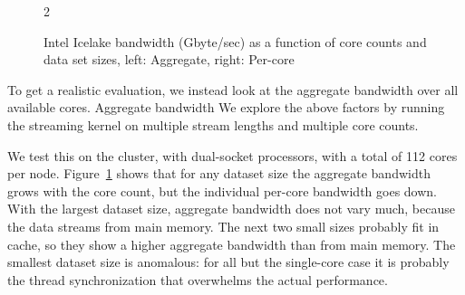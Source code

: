 \begin{figure}[t]
  \pgfplotsset{table/col sep=comma}
  \begin{multicols}{2}
   \columnbreak
  \end{multicols}
  \caption{Intel Icelake bandwidth (Gbyte/sec) as a function of core counts and data set sizes, left: Aggregate, right: Per-core}
  \label{fig:aggregate-bandwidth}
\end{figure}

To get a realistic evaluation, we instead look
at the aggregate bandwidth over all available cores.
%
   {Aggregate bandwidth}
%
We explore the above factors by running the streaming kernel
on multiple stream lengths and multiple core counts.
%

We test this on the  cluster,
with dual-socket  processors,
with a total of 112 cores per node.
%
Figure~\ref{fig:aggregate-bandwidth} shows that
for any dataset size the aggregate bandwidth grows with the core count,
but the individual per-core bandwidth goes down.
With the largest dataset size, aggregate bandwidth does not vary much,
because the data streams from main memory.
The next two small sizes probably fit in cache, so they show a higher
aggregate bandwidth than from main memory.
The smallest dataset size is anomalous: for all but the single-core
case it is probably the thread synchronization that overwhelms the actual
performance.

